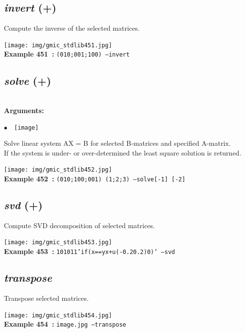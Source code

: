 \documentclass[a4paper,10.5pt,twoside]{book}
\def\comma{\discretionary{,}{}{,}}
\newcommand{\Cb}[1]{\textcolor{cb}{#1}}
\begin{document}
\subsection{\emph{invert} (+)}\vspace*{-0.7em}
Compute the inverse of the selected matrices.
\begin{center}\texttt{[image: img/gmic\_stdlib451.jpg]}\\
{\footnotesize \textbf{Example 451~:} \texttt{(0{\comma}1{\comma}0;0{\comma}0{\comma}1;1{\comma}0{\comma}0) --invert}}
\end{center}

\subsection{\emph{solve} (+)}\vspace*{-0.7em}
~\\\textbf{\Cb{Arguments: }}\begin{flushleft}
{\small \Cb{\hspace*{0.5cm}$\bullet$~~\texttt{[image]}}}\end{flushleft}
Solve linear system AX = B for selected B-matrices and specified A-matrix.
~\\If the system is under- or over-determined{\comma} the least square solution is returned.
\begin{center}\texttt{[image: img/gmic\_stdlib452.jpg]}\\
{\footnotesize \textbf{Example 452~:} \texttt{(0{\comma}1{\comma}0;1{\comma}0{\comma}0;0{\comma}0{\comma}1) (1;2;3) --solve[-1] [-2]}}
\end{center}

\subsection{\emph{svd} (+)}\vspace*{-0.7em}
Compute SVD decomposition of selected matrices.
\begin{center}\texttt{[image: img/gmic\_stdlib453.jpg]}\\
{\footnotesize \textbf{Example 453~:} \texttt{10{\comma}10{\comma}1{\comma}1{\comma}'if(x==y{\comma}x+u(-0.2{\comma}0.2){\comma}0)' --svd}}
\end{center}

\subsection{\emph{transpose} }\vspace*{-0.7em}
Transpose selected matrices.
\begin{center}\texttt{[image: img/gmic\_stdlib454.jpg]}\\
{\footnotesize \textbf{Example 454~:} \texttt{image.jpg --transpose}}
\end{center}
\end{document}
